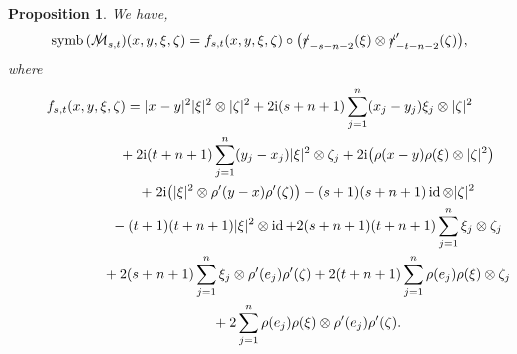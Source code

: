 \documentclass[pdftex]{sigma}
\DeclareMathOperator{\symb}{symb}
\DeclareMathOperator{\id}{id}
\newcommand{\fsl}[1]{{\slashed{#1}}} %
\numberwithin{equation}{section}
\newtheorem{prop}[theor]{Proposition}
\begin{document}
\begin{prop} \label{symb-F-s-t} We have,
\begin{gather*}
\symb\,(\fsl{\mathcal M}_{s,t})(x,y,\xi,\zeta)= f_{s,t}(x,y, \xi,\zeta) \circ \big( \fsl{r}_{-s-n-2}(\xi) \otimes \fsl{r}'_{-t-n-2}(\zeta)\big),
\end{gather*}
where
\begin{gather*}
f_{s,t}(x,y,\xi,\zeta) = \vert x-y\vert^2 \vert \xi\vert^2 \otimes \vert \zeta\vert^2
 +2{\rm i}(s+n+1) \sum_{j=1}^n (x_j-y_j)\xi_j\otimes \vert \zeta\vert^2
 \\ \hphantom{f_{s,t}(x,y,\xi,\zeta)=}
{} +2{\rm i}(t+n+1) \sum_{j=1}^n (y_j-x_j) \vert \xi\vert^2 \otimes \zeta_j
 +2{\rm i} \big(\rho(x-y)\rho(\xi)\otimes \vert \zeta\vert^2\big)
 \\ \hphantom{f_{s,t}(x,y,\xi,\zeta)=}
 {}+2{\rm i} \big(\vert \xi\vert^2 \otimes \rho'(y-x)\rho'(\zeta)\big)
 -(s+1)(s+n+1) \id\otimes \vert \zeta\vert^2
 \\ \hphantom{f_{s,t}(x,y,\xi,\zeta)=}
{} -(t+1)(t+n+1) \vert \xi\vert^2 \otimes \id
 +2(s+n+1)(t+n+1) \sum_{j=1}^n \xi_j\otimes \zeta_j
 \\ \hphantom{f_{s,t}(x,y,\xi,\zeta)=}
{} +2(s+n+1) \sum_{j=1}^n \xi_j\otimes \rho'(e_j)\rho'(\zeta)
+2(t+n+1)\sum_{j=1}^n \rho(e_j)\rho(\xi)\otimes \zeta_j
\\ \hphantom{f_{s,t}(x,y,\xi,\zeta)=}
{} +2\sum_{j=1}^n \rho(e_j)\rho(\xi)\otimes \rho'(e_j)\rho'(\zeta) .
\end{gather*}
\end{prop}
\end{document}
